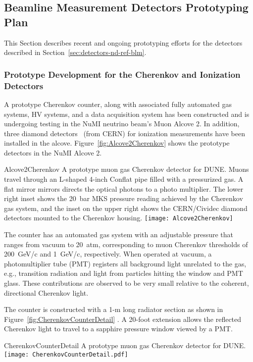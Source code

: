 \subsection{Beamline Measurement Detectors Prototyping Plan}
\label{sec:proto-nd-blm}
This Section describes recent and ongoing prototyping efforts for the detectors described in Section~\ref{sec:detectors-nd-ref-blm}.


\subsubsection{Prototype Development for the Cherenkov and Ionization Detectors}
\label{subsec:proto-blm-muon-cherenkov-proto}

A prototype Cherenkov counter, along with associated fully automated
gas systems, HV systems, and a data acquisition system has been
constructed and is undergoing testing in the NuMI neutrino beam's Muon
Alcove 2. In addition, three diamond detectors~\cite{ref:CERNdiamond} (from CERN)
for ionization measurements have  been installed in the alcove. 
Figure~\ref{fig:Alcove2Cherenkov} shows the prototype detectors in the
NuMI Alcove 2.
\begin{cdrfigure}{Alcove2Cherenkov}
{A prototype muon gas Cherenkov detector for DUNE.
Muons travel through an L-shaped 4-inch Conflat pipe filled with a
pressurized gas. A flat mirror mirrors directs the optical photons
to a photo multiplier. The lower right inset shows the 20~bar MKS
pressure reading achieved by the Cherenkov gas system, and the inset
on the upper right shows the CERN/Cividec diamond detectors mounted to the Cherenkov housing.}
\texttt{[image: Alcove2Cherenkov]}
\end{cdrfigure}

The counter has an automated gas system with an adjustable %
pressure that
ranges from vacuum to 20~atm, corresponding to muon Cherenkov
thresholds of 200~GeV/c and 1~GeV/c, respectively. When operated at
vacuum, a photomultiplier tube (PMT) registers all background light unrelated to the gas,
e.g., transition radiation and light from particles hitting the window and
PMT glass.  These contributions are observed to be very small relative
to the coherent, directional Cherenkov light.

The counter is constructed with a 1-m long radiator section as shown
in Figure~\ref{fig:CherenkovCounterDetail} . A 20-foot extension
allows the reflected Cherenkov light to travel to a sapphire pressure
window viewed by a PMT.
\begin{cdrfigure}{CherenkovCounterDetail}
{A prototype muon gas Cherenkov detector for DUNE.  }
\texttt{[image: CherenkovCounterDetail.pdf]}
\end{cdrfigure}


